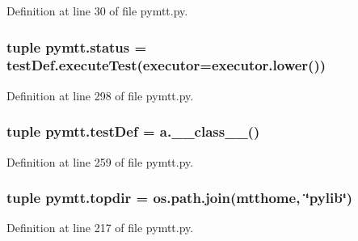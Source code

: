 Definition at line 30 of file pymtt.\-py.

\hypertarget{namespacepymtt_a1a2fd13626c1c2d248cedc138e8660ec}{
\subsubsection[{status}]{\setlength{\rightskip}{0pt plus 5cm}tuple pymtt.\-status = test\-Def.\-execute\-Test({\bf executor}=executor.\-lower())}}\label{namespacepymtt_a1a2fd13626c1c2d248cedc138e8660ec}


Definition at line 298 of file pymtt.\-py.

\hypertarget{namespacepymtt_afebe539e6104da8ebd3d06b7a0e77fe7}{
\subsubsection[{test\-Def}]{\setlength{\rightskip}{0pt plus 5cm}tuple pymtt.\-test\-Def = a.\-\_\-\-\_\-class\-\_\-\-\_\-()}}\label{namespacepymtt_afebe539e6104da8ebd3d06b7a0e77fe7}


Definition at line 259 of file pymtt.\-py.

\hypertarget{namespacepymtt_ac673c895b8c93a029d2a1655c04af315}{
\subsubsection[{topdir}]{\setlength{\rightskip}{0pt plus 5cm}tuple pymtt.\-topdir = os.\-path.\-join({\bf mtthome}, \char`\"{}pylib\char`\"{})}}\label{namespacepymtt_ac673c895b8c93a029d2a1655c04af315}


Definition at line 217 of file pymtt.\-py.

